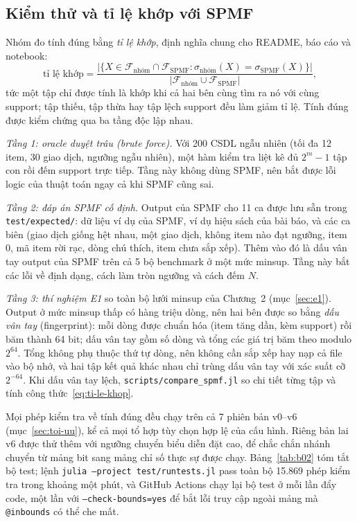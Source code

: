 \subsection{Kiểm thử và tỉ lệ khớp với SPMF}
\label{sec:kiem-thu}

Nhóm đo tính đúng bằng \emph{tỉ lệ khớp}, định nghĩa chung cho README, báo cáo và notebook:
\begin{equation}
\text{tỉ lệ khớp} = \frac{|\{X \in \mathcal{F}_{\text{nhóm}} \cap \mathcal{F}_{\text{SPMF}} : \sigma_{\text{nhóm}}(X) = \sigma_{\text{SPMF}}(X)\}|}{|\mathcal{F}_{\text{nhóm}} \cup \mathcal{F}_{\text{SPMF}}|},
\label{eq:ti-le-khop}
\end{equation}
tức một tập chỉ được tính là khớp khi cả hai bên cùng tìm ra nó với cùng support; tập thiếu, tập thừa hay tập lệch support đều làm giảm tỉ lệ. Tính đúng được kiểm chứng qua ba tầng độc lập nhau.

\emph{Tầng 1: oracle duyệt trâu (brute force).} Với 200 CSDL ngẫu nhiên (tối đa 12 item, 30 giao dịch, ngưỡng ngẫu nhiên), một hàm kiểm tra liệt kê đủ $2^m - 1$ tập con rồi đếm support trực tiếp. Tầng này không dùng SPMF, nên bắt được lỗi logic của thuật toán ngay cả khi SPMF cũng sai.

\emph{Tầng 2: đáp án SPMF cố định.} Output của SPMF cho 11 ca được lưu sẵn trong \texttt{test/expected/}: dữ liệu ví dụ của SPMF, ví dụ hiệu sách của bài báo, và các ca biên (giao dịch giống hệt nhau, một giao dịch, không item nào đạt ngưỡng, item 0, mã item rời rạc, dòng chú thích, item chưa sắp xếp). Thêm vào đó là dấu vân tay output của SPMF trên cả 5 bộ benchmark ở một mức minsup. Tầng này bắt các lỗi về định dạng, cách làm tròn ngưỡng và cách đếm $N$.

\emph{Tầng 3: thí nghiệm E1} so toàn bộ lưới minsup của Chương~2 (mục~\ref{sec:e1}). Output ở mức minsup thấp có hàng triệu dòng, nên hai bên được so bằng \emph{dấu vân tay} (fingerprint): mỗi dòng được chuẩn hóa (item tăng dần, kèm support) rồi băm thành 64 bit; dấu vân tay gồm số dòng và tổng các giá trị băm theo modulo $2^{64}$. Tổng không phụ thuộc thứ tự dòng, nên không cần sắp xếp hay nạp cả file vào bộ nhớ, và hai tập kết quả khác nhau chỉ trùng dấu vân tay với xác suất cỡ $2^{-64}$. Khi dấu vân tay lệch, \texttt{scripts/compare\_spmf.jl} so chi tiết từng tập và tính công thức~\eqref{eq:ti-le-khop}.

Mọi phép kiểm tra về tính đúng đều chạy trên cả 7 phiên bản v0--v6 (mục~\ref{sec:toi-uu}), kể cả mọi tổ hợp tùy chọn hợp lệ của cấu hình. Riêng bản lai v6 được thử thêm với ngưỡng chuyển biểu diễn đặt cao, để chắc chắn nhánh chuyển từ mảng bit sang mảng chỉ số thực sự được chạy. Bảng~\ref{tab:b02} tóm tắt bộ test; lệnh \texttt{julia --project test/runtests.jl} pass toàn bộ 15.869 phép kiểm tra trong khoảng một phút, và GitHub Actions chạy lại bộ test ở mỗi lần đẩy code, một lần với \texttt{--check-bounds=yes} để bắt lỗi truy cập ngoài mảng mà \texttt{@inbounds} có thể che mất.

